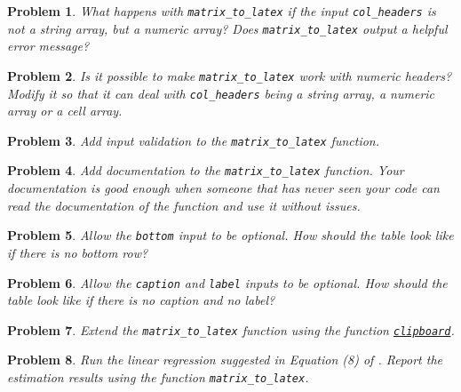 \documentclass[12pt, a4paper]{article}
\newtheorem{problem}{Problem}
\begin{document}
\begin{problem}
What happens with \texttt{matrix\_to\_latex} if the input \texttt{col\_headers} is not a string array, but a numeric array?
Does \texttt{matrix\_to\_latex} output a helpful error message?
\end{problem}

\begin{problem}
Is it possible to make \texttt{matrix\_to\_latex} work with numeric headers?
Modify it so that it can deal with \texttt{col\_headers} being a string array, a numeric array or a cell array.
\end{problem}

\begin{problem}
Add input validation to the \texttt{matrix\_to\_latex} function.
\end{problem}

\begin{problem}
Add documentation to the \texttt{matrix\_to\_latex} function.
Your documentation is good enough when someone that has never seen your code can read the documentation of the function and use it without issues.
\end{problem}

\begin{problem}
Allow the \texttt{bottom} input to be optional.
How should the table look like if there is no bottom row?
\end{problem}

\begin{problem}
Allow the \texttt{caption} and \texttt{label} inputs to be optional.
How should the table look like if there is no caption and no label?
\end{problem}

\begin{problem}
Extend the \texttt{matrix\_to\_latex} function using the function \href{https://www.mathworks.com/help/matlab/ref/clipboard.html?s\_tid=doc\_ta}{\texttt{clipboard}}.
\end{problem}

\begin{problem}
Run the linear regression suggested in Equation (8) of \citet{PB1997}.
Report the estimation results using the function \texttt{matrix\_to\_latex}.
\end{problem}
\end{document}
